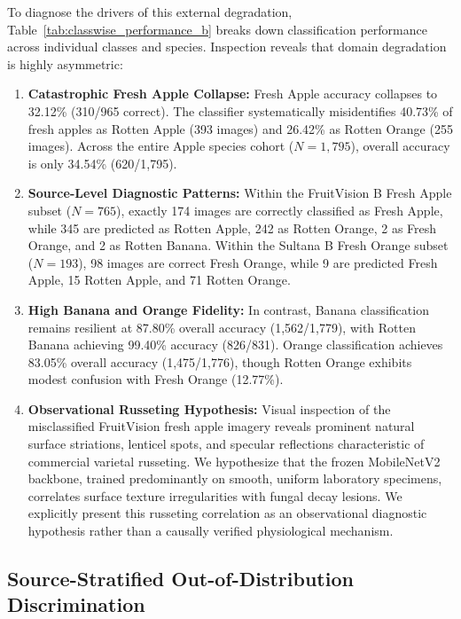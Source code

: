 To diagnose the drivers of this external degradation, Table~\ref{tab:classwise_performance_b} breaks down classification performance across individual classes and species. Inspection reveals that domain degradation is highly asymmetric:
\begin{enumerate}
\setlength{\itemsep}{0pt}
\setlength{\parsep}{0pt}
\setlength{\parskip}{0pt}
\setlength{\topsep}{1pt}
\setlength{\partopsep}{0pt}
\item \textbf{Catastrophic Fresh Apple Collapse:} Fresh Apple accuracy collapses to 32.12\% (310/965 correct). The classifier systematically misidentifies 40.73\% of fresh apples as Rotten Apple (393 images) and 26.42\% as Rotten Orange (255 images). Across the entire Apple species cohort ($N = 1,795$), overall accuracy is only 34.54\% (620/1,795).
\item \textbf{Source-Level Diagnostic Patterns:} Within the FruitVision B Fresh Apple subset ($N = 765$), exactly 174 images are correctly classified as Fresh Apple, while 345 are predicted as Rotten Apple, 242 as Rotten Orange, 2 as Fresh Orange, and 2 as Rotten Banana. Within the Sultana B Fresh Orange subset ($N = 193$), 98 images are correct Fresh Orange, while 9 are predicted Fresh Apple, 15 Rotten Apple, and 71 Rotten Orange.
\item \textbf{High Banana and Orange Fidelity:} In contrast, Banana classification remains resilient at 87.80\% overall accuracy (1,562/1,779), with Rotten Banana achieving 99.40\% accuracy (826/831). Orange classification achieves 83.05\% overall accuracy (1,475/1,776), though Rotten Orange exhibits modest confusion with Fresh Orange (12.77\%).
\item \textbf{Observational Russeting Hypothesis:} Visual inspection of the misclassified FruitVision fresh apple imagery reveals prominent natural surface striations, lenticel spots, and specular reflections characteristic of commercial varietal russeting. We hypothesize that the frozen MobileNetV2 backbone, trained predominantly on smooth, uniform laboratory specimens, correlates surface texture irregularities with fungal decay lesions. We explicitly present this russeting correlation as an observational diagnostic hypothesis rather than a causally verified physiological mechanism.
\end{enumerate}

\vspace*{-4pt}\subsection{Source-Stratified Out-of-Distribution Discrimination}
\label{sec:results_ood_discrimination}

